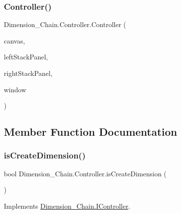 \subsubsection{\texorpdfstring{Controller()}{Controller()}}
{\footnotesize\ttfamily Dimension\+\_\+\+Chain.\+Controller.\+Controller (\begin{DoxyParamCaption}\item[{Canvas}]{canvas,  }\item[{Stack\+Panel}]{left\+Stack\+Panel,  }\item[{Stack\+Panel}]{right\+Stack\+Panel,  }\item[{\mbox{\hyperlink{class_dimension___chain_1_1_main_window}{Main\+Window}}}]{window }\end{DoxyParamCaption})}



\subsection{Member Function Documentation}
\mbox{\label{class_dimension___chain_1_1_controller_ae8c6a98ffe1507c958ca65e93d533c87}} 
\subsubsection{\texorpdfstring{is\+Create\+Dimension()}{isCreateDimension()}}
{\footnotesize\ttfamily bool Dimension\+\_\+\+Chain.\+Controller.\+is\+Create\+Dimension (\begin{DoxyParamCaption}{ }\end{DoxyParamCaption})}



Implements \mbox{\hyperlink{interface_dimension___chain_1_1_i_controller_a228ee16ef616fee00fc5141e3ebef9db}{Dimension\+\_\+\+Chain.\+I\+Controller}}.

\mbox{\label{class_dimension___chain_1_1_controller_ac398246345f2b29698291b468aa0f491}} 
